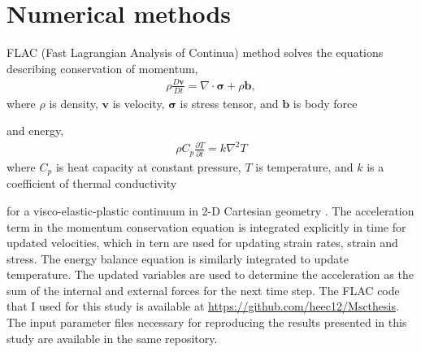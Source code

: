 \documentclass[letterpaper,12pt,notitle]{memphisthesis}                     %
\begin{document}

%
%
%
%

\section{Numerical methods}
FLAC (Fast Lagrangian Analysis of Continua) method solves the equations describing conservation of momentum,
\begin{align}
\rho \frac{D \mathbf{v}}{Dt} = \nabla \cdot \boldsymbol{\sigma} + \rho \mathbf{b},
\end{align}
where $\rho$ is density, $\mathbf{v}$ is velocity, $\boldsymbol{\sigma}$ is stress tensor, and $\mathbf{b}$ is body force%

\noindent and energy, 
\begin{align}
\rho C_{p} \frac{\partial T}{\partial t} = k \nabla^2 T
\end{align}
where $C_{p}$ is heat capacity at constant pressure, $T$ is temperature, and $k$ is a coefficient of thermal conductivity

\noindent for a visco-elastic-plastic continuum in 2-D Cartesian geometry \citep{Cundall1982, Poliakov1993, Lavier2002}. The acceleration term in the momentum conservation equation is  integrated explicitly in time for updated velocities, which in tern are used for updating strain rates, strain and stress. The energy balance equation is similarly integrated to update temperature. The updated variables are used to determine the acceleration as the sum of the internal and external forces for the next time step. The FLAC code that I used for this study is available at \url{https://github.com/heec12/Mscthesis}. The input parameter files necessary for reproducing the results presented in this study are available in the same repository.
\end{document}
